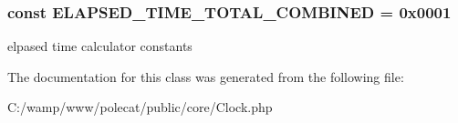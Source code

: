 \subsubsection[{E\+L\+A\+P\+S\+E\+D\+\_\+\+T\+I\+M\+E\+\_\+\+T\+O\+T\+A\+L\+\_\+\+C\+O\+M\+B\+I\+N\+E\+D}]{\setlength{\rightskip}{0pt plus 5cm}const E\+L\+A\+P\+S\+E\+D\+\_\+\+T\+I\+M\+E\+\_\+\+T\+O\+T\+A\+L\+\_\+\+C\+O\+M\+B\+I\+N\+E\+D = 0x0001}\label{class_able_polecat___clock_a88569a59df69a0777e5206c28facbf63}
elpased time calculator constants 

The documentation for this class was generated from the following file\+:\begin{DoxyCompactItemize}
\item 
C\+:/wamp/www/polecat/public/core/Clock.\+php\end{DoxyCompactItemize}

